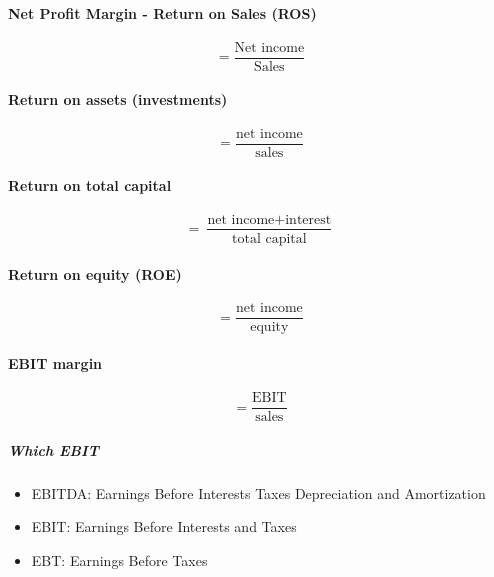 \documentclass[a4paper] {scrartcl}
\begin{document}
\paragraph{Net Profit Margin - Return on Sales (ROS)} %
\label{par:net_profit_margin}
\begin{equation}
	=\frac{\text{Net income}}{\text{Sales}}
\end{equation}

\paragraph{Return on assets (investments)} %
\label{par:return_on_assets}
\begin{equation}
	= \frac{\text{net income}}{\text{sales}}
\end{equation}


\paragraph{Return on total capital} %
\label{par:paragraph_name}
\begin{equation}
	= \frac{\text{net income} + \text{interest}}{\text{total capital}}
\end{equation}

\paragraph{Return on equity (ROE)} %
\label{par:return_on_equity_roe_}
\begin{equation}
	=\frac{\text{net income}}{\text{equity}}
\end{equation}

\paragraph{EBIT margin} %
\label{par:ebit_margin}
\begin{equation}
	=\frac{\text{EBIT}}{\text{sales}}
\end{equation}

\subparagraph{Which EBIT} %
\label{subp:which_ebit}
\begin{itemize}
	\item EBITDA: Earnings Before Interests Taxes Depreciation and Amortization
	\item EBIT: Earnings Before Interests and Taxes
	\item EBT: Earnings Before Taxes
\end{itemize}
\end{document}
